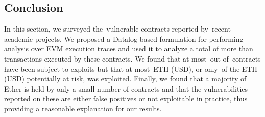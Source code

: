 \subsection{Conclusion}
\label{sec:conclusion}

In this section, we surveyed the~\VulnerableContracts vulnerable contracts reported by~\PapersAnalyzed recent academic projects. We proposed a Datalog-based formulation for performing analysis over EVM execution traces and used it to analyze a total of more than~ transactions executed by these contracts. We found that at most~\NumExploitedContracts out of~\VulnerableContracts contracts have been subject to exploits but that at most~\ExploitedEther ETH (\ExploitedEtherUSD USD), or only~\PercentExploitedEther of the \EtherClaimedVulnerable ETH (\EtherClaimedVulnerableUSD USD) potentially at risk, was exploited.
Finally, we found that a majority of Ether is held by only a small number of contracts and that the vulnerabilities reported on these are either false positives or not exploitable in practice, thus providing a reasonable explanation for our results.

